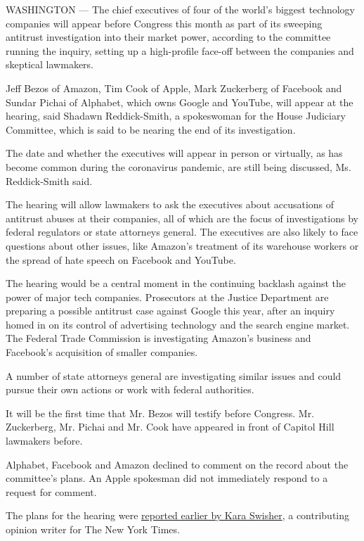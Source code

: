 WASHINGTON --- The chief executives of four of the world's biggest
technology companies will appear before Congress this month as part of
its sweeping antitrust investigation into their market power, according
to the committee running the inquiry, setting up a high-profile face-off
between the companies and skeptical lawmakers.

Jeff Bezos of Amazon, Tim Cook of Apple, Mark Zuckerberg of Facebook and
Sundar Pichai of Alphabet, which owns Google and YouTube, will appear at
the hearing, said Shadawn Reddick-Smith, a spokeswoman for the House
Judiciary Committee, which is said to be nearing the end of its
investigation.

The date and whether the executives will appear in person or virtually,
as has become common during the coronavirus pandemic, are still being
discussed, Ms. Reddick-Smith said.

The hearing will allow lawmakers to ask the executives about accusations
of antitrust abuses at their companies, all of which are the focus of
investigations by federal regulators or state attorneys general. The
executives are also likely to face questions about other issues, like
Amazon's treatment of its warehouse workers or the spread of hate speech
on Facebook and YouTube.

The hearing would be a central moment in the continuing backlash against
the power of major tech companies. Prosecutors at the Justice Department
are preparing a possible antitrust case against Google this year, after
an inquiry homed in on its control of advertising technology and the
search engine market. The Federal Trade Commission is investigating
Amazon's business and Facebook's acquisition of smaller companies.

A number of state attorneys general are investigating similar issues and
could pursue their own actions or work with federal authorities.

It will be the first time that Mr. Bezos will testify before Congress.
Mr. Zuckerberg, Mr. Pichai and Mr. Cook have appeared in front of
Capitol Hill lawmakers before.

Alphabet, Facebook and Amazon declined to comment on the record about
the committee's plans. An Apple spokesman did not immediately respond to
a request for comment.

The plans for the hearing were
\href{https://twitter.com/karaswisher/status/1278432076476428292}{reported
earlier by Kara Swisher}, a contributing opinion writer for The New York
Times.

